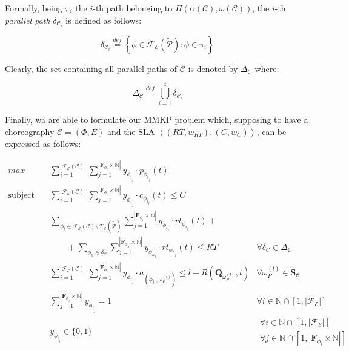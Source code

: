 \documentclass[12pt,a4paper]{report}
\newcommand{\mathDef}{\overset{\textit{def}}{=}}
\newcommand{\N}{\mathbb{N}}
\begin{document}
Formally, being $\pi_i$ the $i$-th path belonging to $\Pi(\alpha(\mathcal{C}),\omega(\mathcal{C}))$, the $i$-th \textit{parallel path} $\delta_{\mathcal{C}_i}$ is defined as follows:

\begin{equation}
	\delta_{\mathcal{C}_i} \mathDef \left\{ \phi \in \mathscr{F_E}(\mathcal{\widetilde{P}}) : \phi \in \pi_i \right\}
\end{equation}

Clearly, the set containing all parallel paths of $\mathcal{C}$ is denoted by $\Delta_{\mathcal{C}}$ where: 

\begin{equation}
	\Delta_{\mathcal{C}} \mathDef \bigcup_{i=1}^z \delta_{\mathcal{C}_i}
\end{equation}

Finally, wa are able to formulate our MMKP problem which, supposing to have a choreography $\mathcal{C} = (\Phi,E)$ and the SLA $\left\langle (RT,w_{RT}),(C,w_{C}) \right\rangle$, can be expressed as follows:

\begin{align}
	\displaystyle max \quad & \displaystyle \sum_{i = 1}^{|\mathscr{F_E}(\mathcal{C})|}  \sum_{j = 1}^{|\textbf{F}_{\phi_{i}} \times \N|} y_{\phi_{i_{j}}} \cdot p_{\phi_{i_{j}}}(t) & \label{MMPKObjective}\\	
	\text{subject to} \quad  & \displaystyle \sum_{i = 1}^{|\mathscr{F_E}(\mathcal{C})|}  \sum_{j = 1}^{|\textbf{F}_{\phi_{i}} \times \N|} y_{\phi_{i_{j}}} \cdot c_{\phi_{i_{j}}}(t) \leq C & \label{MMPKCost} \\
	& \displaystyle \sum_{\phi_i \in \mathscr{F_E}(\mathcal{C}) \setminus \mathscr{F_E}(\mathcal{\widetilde{P}})}  \sum_{j = 1}^{|\textbf{F}_{\phi_{i}} \times \N|} y_{\phi_{i_{j}}} \cdot rt_{\phi_{i_{j}}}(t) + \nonumber \\
	& \qquad + \sum_{\phi_h \in \delta_{\mathcal{C}}}  \sum_{j = 1}^{|\textbf{F}_{\phi_{h}} \times \N|} y_{\phi_{h_{j}}} \cdot rt_{\phi_{h_{j}}}(t) \leq RT \label{MMPKDelay} & 
	\forall \delta_{\mathcal{C}} \in \Delta_{\mathcal{C}} \\	
	& \displaystyle \sum_{i = 1}^{|\mathscr{F_E}(\mathcal{C})|}  \sum_{j = 1}^{|\textbf{F}_{\phi_{i}} \times \N|} y_{\phi_{i_{j}}} \cdot a_{(\phi_{i_{j}},\omega_{P}^{(l)})} \leq l - R(\textbf{Q}_{\omega_{P}^{(l)}}, t) &  \forall \omega_{P}^{(l)} \in \widetilde{\textbf{S}}_{\mathcal{C}} \label{MMPKCapacity} \\
	& \displaystyle \sum_{j = 1}^{|\textbf{F}_{\phi_{i}} \times \N|} y_{\phi_{i_{j}}} = 1 & \forall i \in \N \cap \left[ 1, |\mathscr{F_E}| \right] \label{MMPKOvvio} \\
	& y_{\phi_{i_{j}}} \in \lbrace 0, 1 \rbrace &
	\begin{array}{r}
		\forall i \in \N \cap \left[ 1, |\mathscr{F_E}| \right] \\ \forall j \in \N \cap [1,|\textbf{F}_{\phi_{i}} \times \N|] \label{MMPKOvvio2}
	\end{array}
\end{align}
\end{document}
